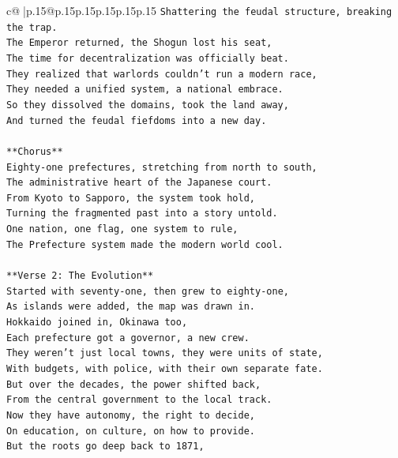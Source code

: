 \documentclass{article}
\begin{document}
{\begin{supertabular}{c@{$\;$}|p{.15\linewidth}@{}p{.15\linewidth}p{.15\linewidth}p{.15\linewidth}p{.15\linewidth}p{.15\linewidth}}
{{{\texttt{Shattering the feudal structure, breaking the trap.} \\
\texttt{The Emperor returned, the Shogun lost his seat,} \\
\texttt{The time for decentralization was officially beat.} \\
\texttt{They realized that warlords couldn't run a modern race,} \\
\texttt{They needed a unified system, a national embrace.} \\
\texttt{So they dissolved the domains, took the land away,} \\
\texttt{And turned the feudal fiefdoms into a new day.} \\
\\ 
\texttt{**Chorus**} \\
\texttt{Eighty{-}one prefectures, stretching from north to south,} \\
\texttt{The administrative heart of the Japanese court.} \\
\texttt{From Kyoto to Sapporo, the system took hold,} \\
\texttt{Turning the fragmented past into a story untold.} \\
\texttt{One nation, one flag, one system to rule,} \\
\texttt{The Prefecture system made the modern world cool.} \\
\\ 
\texttt{**Verse 2: The Evolution**} \\
\texttt{Started with seventy{-}one, then grew to eighty{-}one,} \\
\texttt{As islands were added, the map was drawn in.} \\
\texttt{Hokkaido joined in, Okinawa too,} \\
\texttt{Each prefecture got a governor, a new crew.} \\
\texttt{They weren't just local towns, they were units of state,} \\
\texttt{With budgets, with police, with their own separate fate.} \\
\texttt{But over the decades, the power shifted back,} \\
\texttt{From the central government to the local track.} \\
\texttt{Now they have autonomy, the right to decide,} \\
\texttt{On education, on culture, on how to provide.} \\
\texttt{But the roots go deep back to 1871,} \\
}}}
\end{supertabular}}
\end{document}
